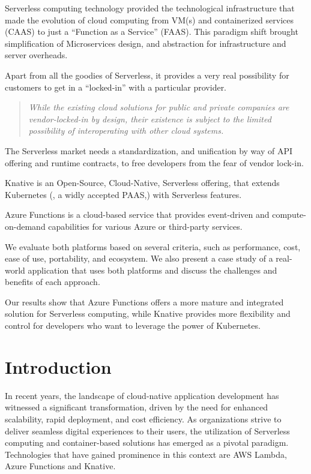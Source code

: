 \documentclass{article}
\begin{document}
Serverless computing technology provided the technological infrastructure that made the evolution of cloud computing from \gls{VM}(s) and containerized services (\gls{CAAS}) to just a “Function as a Service” (\gls{FAAS}). This paradigm shift brought simplification of Microservices design, and abstraction for infrastructure and server overheads.

Apart from all the goodies of Serverless, it provides a very real possibility for customers to get in a “locked-in” with a particular provider. 

\begin{quote}
    \textit{While the existing cloud solutions for public and private companies are vendor-locked-in by design, their existence is subject to the limited possibility of interoperating with other cloud systems.}\\
    \cite{Opara-Martins-2014} 
\end{quote}

The Serverless market needs a standardization, and unification by way of API offering and runtime contracts, to free developers from the fear of vendor lock-in. 

Knative is an Open-Source, Cloud-Native, Serverless offering, that extends Kubernetes (, a widly accepted \gls{PAAS},) with Serverless features. 

Azure Functions is a cloud-based service that provides event-driven and compute-on-demand capabilities for various Azure or third-party services. 

We evaluate both platforms based on several criteria, such as performance, cost, ease of use, portability, and ecosystem. We also present a case study of a real-world application that uses both platforms and discuss the challenges and benefits of each approach. 

Our results show that Azure Functions offers a more mature and integrated solution for Serverless computing, while Knative provides more flexibility and control for developers who want to leverage the power of Kubernetes.
    

\pagebreak

\section*{Introduction}
In recent years, the landscape of cloud-native application development has witnessed a significant transformation, driven by the need for enhanced scalability, rapid deployment, and cost efficiency. As organizations strive to deliver seamless digital experiences to their users, the utilization of Serverless computing and container-based solutions has emerged as a pivotal paradigm. Technologies that have gained prominence in this context are \gls{AWS} Lambda, Azure Functions and Knative.
\end{document}
